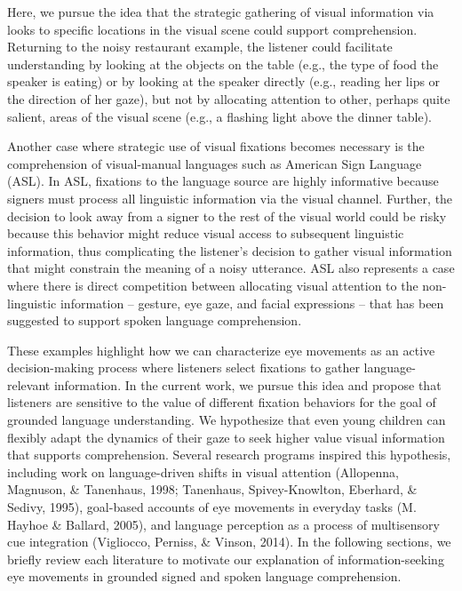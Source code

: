 \documentclass[,man,floatsintext]{apa6}
\begin{document}
Here, we pursue the idea that the strategic gathering of visual
information via looks to specific locations in the visual scene could
support comprehension. Returning to the noisy restaurant example, the
listener could facilitate understanding by looking at the objects on the
table (e.g., the type of food the speaker is eating) or by looking at
the speaker directly (e.g., reading her lips or the direction of her
gaze), but not by allocating attention to other, perhaps quite salient,
areas of the visual scene (e.g., a flashing light above the dinner
table).

Another case where strategic use of visual fixations becomes necessary
is the comprehension of visual-manual languages such as American Sign
Language (ASL). In ASL, fixations to the language source are highly
informative because signers must process all linguistic information via
the visual channel. Further, the decision to look away from a signer to
the rest of the visual world could be risky because this behavior might
reduce visual access to subsequent linguistic information, thus
complicating the listener's decision to gather visual information that
might constrain the meaning of a noisy utterance. ASL also represents a
case where there is direct competition between allocating visual
attention to the non-linguistic information -- gesture, eye gaze, and
facial expressions -- that has been suggested to support spoken language
comprehension.

These examples highlight how we can characterize eye movements as an
active decision-making process where listeners select fixations to
gather language-relevant information. In the current work, we pursue
this idea and propose that listeners are sensitive to the value of
different fixation behaviors for the goal of grounded language
understanding. We hypothesize that even young children can flexibly
adapt the dynamics of their gaze to seek higher value visual information
that supports comprehension. Several research programs inspired this
hypothesis, including work on language-driven shifts in visual attention
(Allopenna, Magnuson, \& Tanenhaus, 1998; Tanenhaus, Spivey-Knowlton,
Eberhard, \& Sedivy, 1995), goal-based accounts of eye movements in
everyday tasks (M. Hayhoe \& Ballard, 2005), and language perception as
a process of multisensory cue integration (Vigliocco, Perniss, \&
Vinson, 2014). In the following sections, we briefly review each
literature to motivate our explanation of information-seeking eye
movements in grounded signed and spoken language comprehension.
\end{document}
